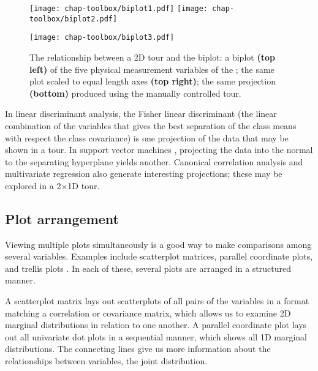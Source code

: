 \begin{figure}[htp]
\centerline{\texttt{[image: chap-toolbox/biplot1.pdf]}
  \texttt{[image: chap-toolbox/biplot2.pdf]}}
\centerline{\texttt{[image: chap-toolbox/biplot3.pdf]}}
\caption[The relationship between a 2D tour and the biplot]{The
relationship between a 2D tour and the biplot: a biplot {\bf (top
left)} of the five physical measurement variables of the
; the same plot scaled to equal length axes
{\bf (top right)}; the same projection {\bf (bottom)} produced using
the manually controlled tour.}
\label{biplot}
\end{figure}

In linear discriminant analysis, the Fisher linear discriminant (the
linear combination of the variables that gives the best separation of
the class means with respect the class covariance) is one projection
of the data that may be shown in a tour.  In support vector machines
\cite{Va99}, projecting the data into the normal to the separating
hyperplane yields another.  Canonical correlation analysis and
multivariate regression also generate interesting projections; these
may be explored in a 2$\times$1D tour.

\subsection{Plot arrangement}


Viewing multiple plots simultaneously is a good way to make
comparisons among several variables.  Examples include scatterplot
matrices, parallel coordinate plots, and trellis plots
\cite{BeCS96}. In each of these, several plots are arranged in a
structured manner.


A scatterplot matrix lays out scatterplots of all pairs of the
variables in a format matching a correlation or covariance matrix,
which allows us to examine 2D marginal distributions in relation to
one another. A parallel coordinate plot lays out all univariate
dot plots in a sequential manner, which shows all 1D marginal
distributions. The connecting lines give us more information about the
relationships between variables, the joint distribution.

